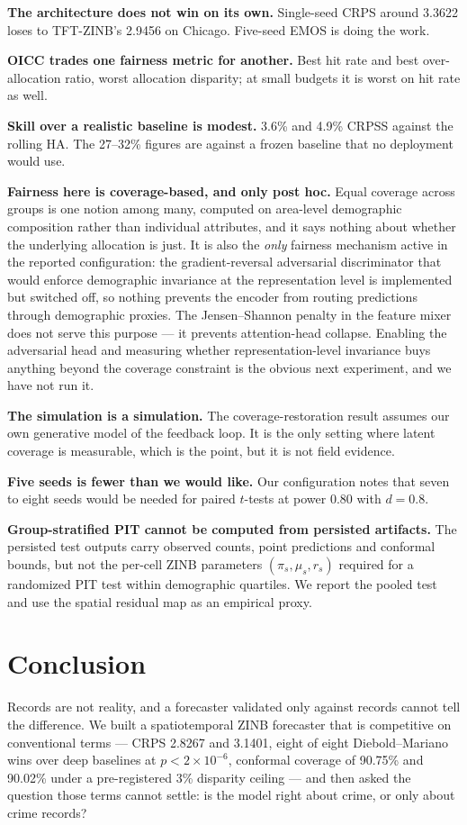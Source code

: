 \documentclass[journal,10pt,twocolumn]{IEEEtran}
\begin{document}
\textbf{The architecture does not win on its own.} Single-seed CRPS around 3.3622
loses to TFT-ZINB's 2.9456 on Chicago. Five-seed EMOS is doing the work.

\textbf{OICC trades one fairness metric for another.} Best hit rate and best
over-allocation ratio, worst allocation disparity; at small budgets it is worst
on hit rate as well.

\textbf{Skill over a realistic baseline is modest.} 3.6\% and 4.9\% CRPSS against
the rolling HA. The 27--32\% figures are against a frozen baseline that no
deployment would use.

\textbf{Fairness here is coverage-based, and only post hoc.} Equal coverage
across groups is one notion among many, computed on area-level demographic
composition rather than individual attributes, and it says nothing about whether
the underlying allocation is just. It is also the \emph{only} fairness mechanism
active in the reported configuration: the gradient-reversal adversarial
discriminator that would enforce demographic invariance at the representation
level is implemented but switched off, so nothing prevents the encoder from
routing predictions through demographic proxies. The Jensen--Shannon penalty in
the feature mixer does not serve this purpose --- it prevents attention-head
collapse. Enabling the adversarial head and measuring whether representation-level
invariance buys anything beyond the coverage constraint is the obvious next
experiment, and we have not run it.

\textbf{The simulation is a simulation.} The coverage-restoration result assumes
our own generative model of the feedback loop. It is the only setting where latent
coverage is measurable, which is the point, but it is not field evidence.

\textbf{Five seeds is fewer than we would like.} Our configuration notes that
seven to eight seeds would be needed for paired $t$-tests at power 0.80 with
$d = 0.8$.

\textbf{Group-stratified PIT cannot be computed from persisted artifacts.} The
persisted test outputs carry observed counts, point predictions and conformal
bounds, but not the per-cell ZINB parameters $(\pi_s, \mu_s, r_s)$ required for
a randomized PIT test within demographic quartiles. We report the pooled test
and use the spatial residual map as an empirical proxy.

\section{Conclusion}
Records are not reality, and a forecaster validated only against records cannot
tell the difference. We built a spatiotemporal ZINB forecaster that is competitive
on conventional terms --- CRPS 2.8267 and 3.1401, eight of eight
Diebold--Mariano wins over deep baselines at $p < 2\times10^{-6}$, conformal
coverage of 90.75\% and 90.02\% under a pre-registered 3\% disparity ceiling ---
and then asked the question those terms cannot settle: is the model right about
crime, or only about crime records?
\end{document}
